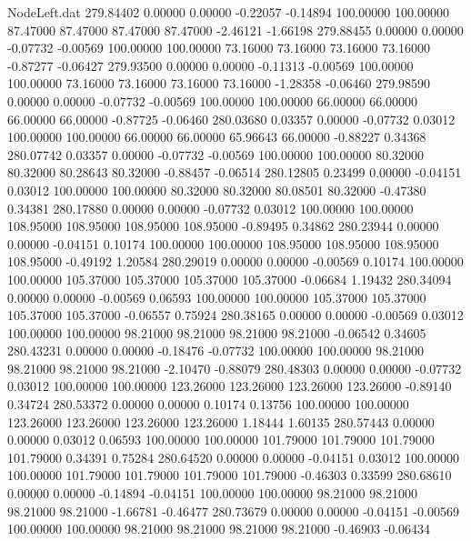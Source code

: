 \begin{filecontents}{NodeLeft.dat}
 279.84402    0.00000    0.00000    -0.22057   -0.14894  100.00000  100.00000   87.47000   87.47000   87.47000   87.47000   -2.46121   -1.66198
 279.88455    0.00000    0.00000    -0.07732   -0.00569  100.00000  100.00000   73.16000   73.16000   73.16000   73.16000   -0.87277   -0.06427
 279.93500    0.00000    0.00000    -0.11313   -0.00569  100.00000  100.00000   73.16000   73.16000   73.16000   73.16000   -1.28358   -0.06460
 279.98590    0.00000    0.00000    -0.07732   -0.00569  100.00000  100.00000   66.00000   66.00000   66.00000   66.00000   -0.87725   -0.06460
 280.03680    0.03357    0.00000    -0.07732    0.03012  100.00000  100.00000   66.00000   66.00000   65.96643   66.00000   -0.88227    0.34368
 280.07742    0.03357    0.00000    -0.07732   -0.00569  100.00000  100.00000   80.32000   80.32000   80.28643   80.32000   -0.88457   -0.06514
 280.12805    0.23499    0.00000    -0.04151    0.03012  100.00000  100.00000   80.32000   80.32000   80.08501   80.32000   -0.47380    0.34381
 280.17880    0.00000    0.00000    -0.07732    0.03012  100.00000  100.00000  108.95000  108.95000  108.95000  108.95000   -0.89495    0.34862
 280.23944    0.00000    0.00000    -0.04151    0.10174  100.00000  100.00000  108.95000  108.95000  108.95000  108.95000   -0.49192    1.20584
 280.29019    0.00000    0.00000    -0.00569    0.10174  100.00000  100.00000  105.37000  105.37000  105.37000  105.37000   -0.06684    1.19432
 280.34094    0.00000    0.00000    -0.00569    0.06593  100.00000  100.00000  105.37000  105.37000  105.37000  105.37000   -0.06557    0.75924
 280.38165    0.00000    0.00000    -0.00569    0.03012  100.00000  100.00000   98.21000   98.21000   98.21000   98.21000   -0.06542    0.34605
 280.43231    0.00000    0.00000    -0.18476   -0.07732  100.00000  100.00000   98.21000   98.21000   98.21000   98.21000   -2.10470   -0.88079
 280.48303    0.00000    0.00000    -0.07732    0.03012  100.00000  100.00000  123.26000  123.26000  123.26000  123.26000   -0.89140    0.34724
 280.53372    0.00000    0.00000     0.10174    0.13756  100.00000  100.00000  123.26000  123.26000  123.26000  123.26000    1.18444    1.60135
 280.57443    0.00000    0.00000     0.03012    0.06593  100.00000  100.00000  101.79000  101.79000  101.79000  101.79000    0.34391    0.75284
 280.64520    0.00000    0.00000    -0.04151    0.03012  100.00000  100.00000  101.79000  101.79000  101.79000  101.79000   -0.46303    0.33599
 280.68610    0.00000    0.00000    -0.14894   -0.04151  100.00000  100.00000   98.21000   98.21000   98.21000   98.21000   -1.66781   -0.46477
 280.73679    0.00000    0.00000    -0.04151   -0.00569  100.00000  100.00000   98.21000   98.21000   98.21000   98.21000   -0.46903   -0.06434

\end{filecontents}
